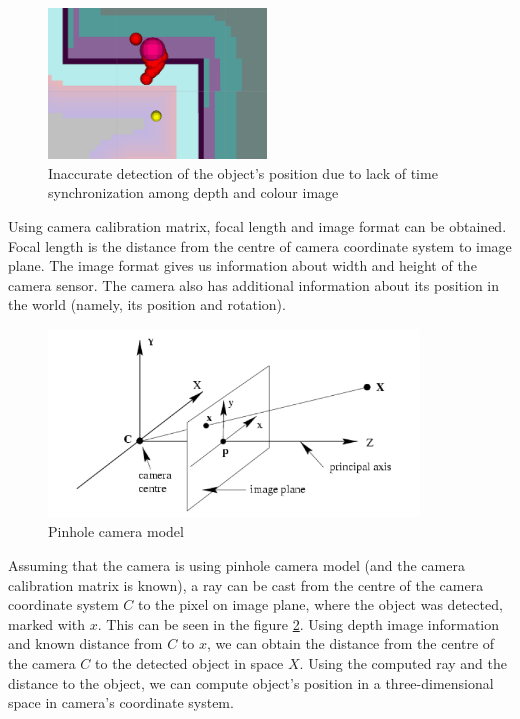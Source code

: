 \documentclass[12pt,a4paper]{article}
\begin{document}
	\begin{figure}[h]
		\centering
		\includegraphics[height=4cm]{images/detections}
		\caption{Inaccurate detection of the object's position due to lack of time synchronization among depth and colour image}
		\label{fig:non_synchronized_raw_detection}
	\end{figure}

	Using camera calibration matrix, focal length and image format can be obtained. Focal length is the distance from the centre of camera coordinate system to image plane. The image format gives us information about width and height of the camera sensor. The camera also has additional information about its position in the world (namely, its position and rotation). \\

	\begin{figure}[h]
		\centering
		\includegraphics[height=5cm]{images/pinhole_camera_model.png}
		\caption{Pinhole camera model}
		\label{fig:pinhole_camera_model}
	\end{figure}
	
	
	Assuming that the camera is using pinhole camera model (and the camera calibration matrix is known), a ray can be cast from the centre of the camera coordinate system $C$ to the pixel on image plane, where the object was detected, marked with $x$. This can be seen in the figure \ref{fig:pinhole_camera_model}. Using depth image information and known distance from $C$ to $x$, we can obtain the distance from the centre of the camera $C$ to the detected object in space $X$. Using the computed ray and the distance to the object, we can compute object's position in a three-dimensional space in camera's coordinate system. \\
	
\end{document}
